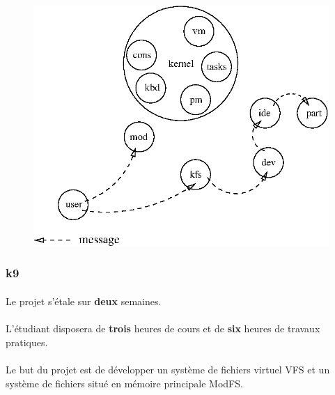 \documentclass[10pt,a4wide]{article}
\begin{document}
\begin{figure}[h]
\centerline{\includegraphics{figures/k8.eps}}
\end{figure}

\newpage

\subsubsection{k9}

\paragraph{}

Le projet s'\'etale sur \textbf{deux} semaines.

\paragraph{}

L'\'etudiant disposera de \textbf{trois} heures de cours et de \textbf{six}
heures de travaux pratiques.

\paragraph{}

Le but du projet est de d\'evelopper un syst\`eme de fichiers virtuel VFS
et un syst\`eme de fichiers situ\'e en m\'emoire principale ModFS.

\paragraph{}
\end{document}
